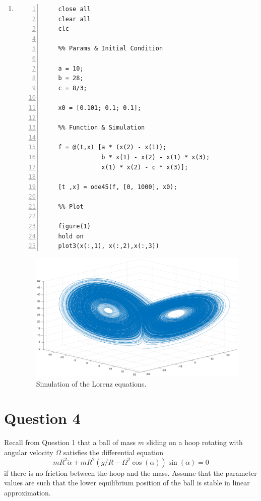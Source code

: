 \documentclass[twoside,10pt,a4paper]{article}
\begin{document}
\begin{enumerate}[label=(\alph*)]
\item
\begin{Verbatim}[numbers = left]
	%% Initiate Script
	close all
	clear all
	clc
	
	%% Params & Initial Condition
	
	a = 10;
	b = 28;
	c = 8/3;
	
	x0 = [0.101; 0.1; 0.1];
	
	%% Function & Simulation
	
	f = @(t,x) [a * (x(2) - x(1));
	            b * x(1) - x(2) - x(1) * x(3);
	            x(1) * x(2) - c * x(3)];
	        
	[t ,x] = ode45(f, [0, 1000], x0);
	
	%% Plot
	
	figure(1)
	hold on
	plot3(x(:,1), x(:,2),x(:,3))
\end{Verbatim}

\newpage

\begin{figure}[H]
	\centering
	\includegraphics[scale=0.48]{Graphics/S03D01.eps}
	\caption{Simulation of the Lorenz equations.}
\end{figure}

\end{enumerate}

\newpage

\section*{Question 4}
Recall from Question 1 that a ball of mass $m$ sliding on a hoop rotating with angular velocity $\Omega$ satisfies the differential equation
\begin{equation}\label{Q04E01}
	mR^2 \ddot{\alpha} + mR^2(g/R - \Omega^2 \cos(\alpha)) \sin(\alpha) = 0
\end{equation}
if there is no friction between the hoop and the mass. Assume that the parameter values are such that the lower equilibrium position of the ball is stable in linear approximation.
\end{document}
